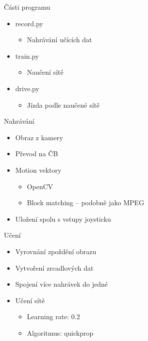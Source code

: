 \documentclass{beamer}
\begin{document}
\begin{frame}{Části programu}
\begin{itemize}
\item record.py
	\begin{itemize}
	\item Nahrávání učících dat
	\end{itemize}
\item train.py
	\begin{itemize}
	\item Naučení sítě
	\end{itemize}
\item drive.py
	\begin{itemize}
	\item Jízda podle naučené sítě
	\end{itemize}
\end{itemize}
\end{frame}

\begin{frame}{Nahrávání}
\begin{itemize}
\item Obraz z kamery
\item Převod na ČB
\item Motion vektory
	\begin{itemize}
	\item OpenCV
	\item Block matching -- podobně jako MPEG
	\end{itemize}
\item Uložení spolu s vstupy joysticku
\end{itemize}
\end{frame}

\begin{frame}{Učení}
\begin{itemize}
\item Vyrovnání zpoždění obrazu
\item Vytvoření zrcadlových dat
\item Spojení více nahrávek do jedné
\item Učení sítě
	\begin{itemize}
	\item Learning rate: 0.2
	\item Algoritmus: quickprop
	\end{itemize}
\end{itemize}
\end{frame}
\end{document}
